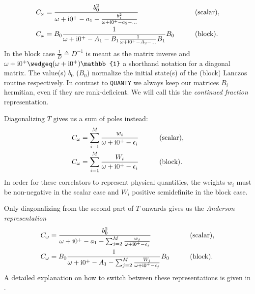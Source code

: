 \begin{subequations}
    \begin{align}
        C_\omega
         & =
        \frac{b_0^2}{\omega + \mathrm{i}0^+ - a_1 - \frac{b_1^2}{\omega + \mathrm{i}0^+ - a_2 - \ldots}}
        \qquad
         &
         & \text{(scalar)},                                                                         \\
        C_\omega
         & = B_0\frac{1}{\omega + \mathrm{i}0^+ - A_1 - B_1\frac{1}{\omega + \mathrm{i}0^+ - A_2 - \ldots}B_1}B_0
        \qquad
         &
         & \text{(block)}.
    \end{align}
\end{subequations}
In the block case $\frac{1}{D} \wedgeq D^{-1}$ is meant as the matrix inverse
and $\omega + \mi0^+ \wedgeq (\omega + \mi0^+)\mathbb{1}$ a shorthand notation
for a diagonal matrix.
The value(s) $b_0$ ($B_0$) normalize the initial state(s) of
the (block) Lanczos routine respectively.
In contrast to \texttt{QUANTY} \cite{Ackermann2024} we always keep our matrices $B_i$ hermitian,
even if they are rank-deficient.
We will call this the \emph{continued fraction} representation.

Diagonalizing $T$ gives us a sum of poles instead:
\begin{subequations}
    \begin{align}
        C_\omega
         & =
        \sum_{i=1}^M \frac{w_i}{\omega + \mathrm{i}0^+ - \epsilon_i}
        \qquad
         &   & \text{(scalar)}, \\
        C_\omega
         & =
        \sum_{i=1}^M \frac{W_i}{\omega + \mathrm{i}0^+ - \epsilon_i}
        \qquad
         &   & \text{(block)}.
    \end{align}
\end{subequations}
In order for these correlators to represent physical quantities,
the weights $w_i$ must be non-negative in the scalar case
and $W_i$ positive semidefinite in the block case.

Only diagonalizing from the second part of $T$ onwards gives us the \emph{Anderson representation}
\begin{subequations}
    \begin{align}
        C_\omega
         & =
        \frac{b_0^2}{\omega + \mathrm{i}0^+ - a_1 - \sum_{j=2}^M \frac{w_j}{\omega + \mathrm{i}0^+ - \epsilon_j}}
        \qquad
         &
         &
        \text{(scalar)},                                                                                   \\
        C_\omega
         & = B_0\frac{1}{\omega + \mathrm{i}0^+ - A_1 - \sum_{j=2}^M \frac{W_j}{\omega + \mathrm{i}0^+ - \epsilon_j}}B_0
        \qquad
         &
         &
        \text{(block)}.
        \label{eq:correlator-anderson-block}
    \end{align}
\end{subequations}
A detailed explanation on how to switch between these representations is given in \cite{Lu2014}.

